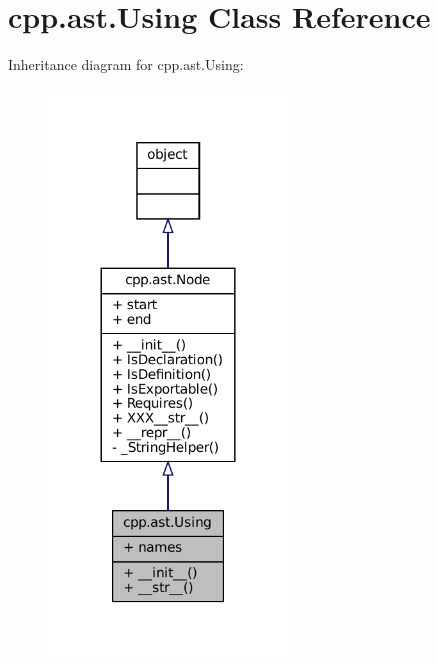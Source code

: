 \hypertarget{classcpp_1_1ast_1_1Using}{}\section{cpp.\+ast.\+Using Class Reference}
\label{classcpp_1_1ast_1_1Using}


Inheritance diagram for cpp.\+ast.\+Using\+:
\nopagebreak
\begin{figure}[H]
\begin{center}
\leavevmode
\includegraphics[width=180pt]{classcpp_1_1ast_1_1Using__inherit__graph}
\end{center}
\end{figure}


